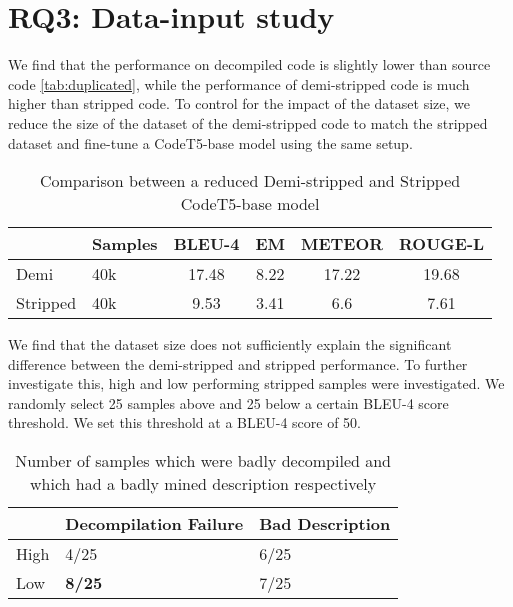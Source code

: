 
\section{RQ3: Data-input study}
We find that the performance on decompiled code is slightly lower than source code \ref{tab:duplicated}, while the performance of demi-stripped code is much higher than stripped code. To control for the impact of the dataset size, we reduce the size of the dataset of the demi-stripped code to match the stripped dataset and fine-tune a CodeT5-base model using the same setup.

\begin{table}[tbh]
\centering
\begin{tabular}{llcccc} 
\hline
\rowcolor[rgb]{0.729,0.729,0.729} \multicolumn{1}{|l}{\textbf{}} & Samples & BLEU-4 & EM   & METEOR & \multicolumn{1}{l|}{ROUGE-L}  \\ 
\hline
Demi                                                             & 40k     & 17.48  & 8.22 & 17.22  &  19.68                             \\
Stripped                                                         & 40k     & 9.53   & 3.41 & 6.6  &  7.61                            
\end{tabular}
\caption{Comparison between a reduced Demi-stripped and Stripped CodeT5-base model}
\label{tab:demiSize}
\end{table}

We find that the dataset size does not sufficiently explain the significant difference between the demi-stripped and stripped performance. To further investigate this, high and low performing stripped samples were investigated. We randomly select 25 samples above and 25 below a certain BLEU-4 score threshold. We set this threshold at a BLEU-4 score of 50.

\begin{table}[tbh]
\centering
\begin{tabular}{lll}
\hline
\rowcolor[HTML]{C0C0C0} 
\multicolumn{1}{|l}{\cellcolor[HTML]{C0C0C0}\textbf{}} & Decompilation Failure & \multicolumn{1}{l|}{\cellcolor[HTML]{C0C0C0}Bad Description} \\ \hline
High                                                   & 4/25                     & 6/25                                                            \\
Low                                                    & \textbf{8/25}                     & 7/25                                                           
\end{tabular}
\caption{Number of samples which were badly decompiled and which had a badly mined description respectively}
\label{tab:manual}
\end{table}

